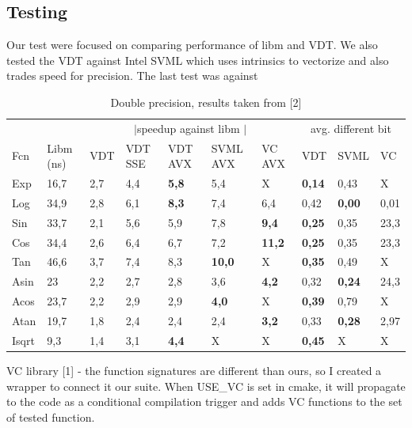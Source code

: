 \documentclass[oneside,10pt,a4paper]{article}
\begin{document}
\subsection{Testing}
Our test were focused on comparing performance of libm and VDT. We also tested the VDT against Intel SVML which uses intrinsics to vectorize and also trades speed for precision. The last test was against
\begin{table}[h]
    \begin{center}
    \begin{tabular}{llllllllll}
      \toprule
      & & \multicolumn{5}{c}{$\!\!\!\!|$\hfill speedup against libm \hfill $|\!\!\!\!$} & \multicolumn{3}{c}{avg. different bit}\\
      Fcn & Libm (ns) & VDT & VDT SSE & VDT AVX & SVML AVX & VC AVX & VDT & SVML & VC\\
      \midrule
    Exp   &16,7& 2,7 & 4,4 & \textbf{5,8} &5,4&X& \textbf{0,14} & 0,43 & X\\
    Log   &34,9& 2,8 & 6,1 & \textbf{8,3} &7,4&6,4& 0,42 & \textbf{0,00} & 0,01\\
    Sin   &33,7& 2,1 & 5,6 & 5,9 &7,8&\textbf{9,4}& \textbf{0,25} & 0,35 & 23,3\\
    Cos   &34,4& 2,6 & 6,4 & 6,7 &7,2&\textbf{11,2}&\textbf{0,25}& 0,35 & 23,3\\
    Tan   &46,6& 3,7 & 7,4 & 8,3 &\textbf{10,0}&X&\textbf{0,35}& 0,49 & X\\
    Asin  &23& 2,2 & 2,7 & 2,8 &3,6&\textbf{4,2}& 0,32 & \textbf{0,24} & 24,3\\
    Acos  &23,7& 2,2 & 2,9 & 2,9 &\textbf{4,0}&X& \textbf{0,39} & 0,79 & X\\
    Atan  &19,7& 1,8 & 2,4 & 2,4 &2,4&\textbf{3,2}& 0,33 & \textbf{0,28} & 2,97\\
    Isqrt &9,3& 1,4 & 3,1 & \textbf{4,4} &X&X& \textbf{0,45} & X    & X\\
      \bottomrule
    \end{tabular}
    \caption{Double precision, results taken from [2]}
    \label{double precision}
    \end{center}
\end{table}
VC library [1] - the function signatures are different than ours, so I created a wrapper to connect it our suite. When USE\_VC is set in cmake, it will propagate to the code as a conditional compilation trigger
and adds VC functions to the set of tested function.
\end{document}
